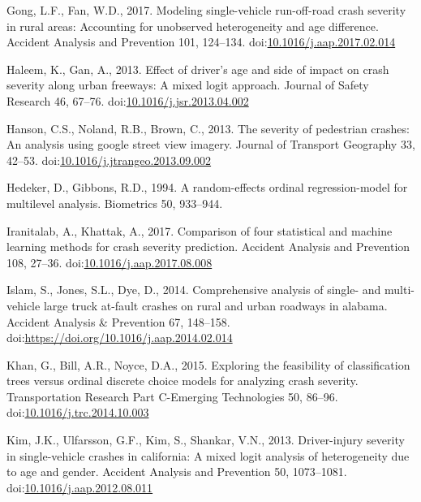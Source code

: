 \documentclass[]{elsarticle} %
\begin{document}
\leavevmode\hypertarget{ref-Gong2017modeling}{}%
Gong, L.F., Fan, W.D., 2017. Modeling single-vehicle run-off-road crash
severity in rural areas: Accounting for unobserved heterogeneity and age
difference. Accident Analysis and Prevention 101, 124--134.
doi:\href{https://doi.org/10.1016/j.aap.2017.02.014}{10.1016/j.aap.2017.02.014}

\leavevmode\hypertarget{ref-Haleem2013effect}{}%
Haleem, K., Gan, A., 2013. Effect of driver's age and side of impact on
crash severity along urban freeways: A mixed logit approach. Journal of
Safety Research 46, 67--76.
doi:\href{https://doi.org/10.1016/j.jsr.2013.04.002}{10.1016/j.jsr.2013.04.002}

\leavevmode\hypertarget{ref-Hanson2013severity}{}%
Hanson, C.S., Noland, R.B., Brown, C., 2013. The severity of pedestrian
crashes: An analysis using google street view imagery. Journal of
Transport Geography 33, 42--53.
doi:\href{https://doi.org/10.1016/j.jtrangeo.2013.09.002}{10.1016/j.jtrangeo.2013.09.002}

\leavevmode\hypertarget{ref-Hedeker1994random}{}%
Hedeker, D., Gibbons, R.D., 1994. A random-effects ordinal
regression-model for multilevel analysis. Biometrics 50, 933--944.

\leavevmode\hypertarget{ref-Iranitalab2017comparison}{}%
Iranitalab, A., Khattak, A., 2017. Comparison of four statistical and
machine learning methods for crash severity prediction. Accident
Analysis and Prevention 108, 27--36.
doi:\href{https://doi.org/10.1016/j.aap.2017.08.008}{10.1016/j.aap.2017.08.008}

\leavevmode\hypertarget{ref-Islam2014comprehensive}{}%
Islam, S., Jones, S.L., Dye, D., 2014. Comprehensive analysis of single-
and multi-vehicle large truck at-fault crashes on rural and urban
roadways in alabama. Accident Analysis \& Prevention 67, 148--158.
doi:\href{https://doi.org/https://doi.org/10.1016/j.aap.2014.02.014}{https://doi.org/10.1016/j.aap.2014.02.014}

\leavevmode\hypertarget{ref-Khan2015exploring}{}%
Khan, G., Bill, A.R., Noyce, D.A., 2015. Exploring the feasibility of
classification trees versus ordinal discrete choice models for analyzing
crash severity. Transportation Research Part C-Emerging Technologies 50,
86--96.
doi:\href{https://doi.org/10.1016/j.trc.2014.10.003}{10.1016/j.trc.2014.10.003}

\leavevmode\hypertarget{ref-Kim2013driver}{}%
Kim, J.K., Ulfarsson, G.F., Kim, S., Shankar, V.N., 2013. Driver-injury
severity in single-vehicle crashes in california: A mixed logit analysis
of heterogeneity due to age and gender. Accident Analysis and Prevention
50, 1073--1081.
doi:\href{https://doi.org/10.1016/j.aap.2012.08.011}{10.1016/j.aap.2012.08.011}
\end{document}
